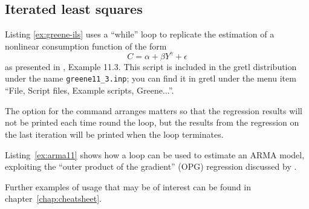 \subsection{Iterated least squares}
\label{loop-ils-examples}

Listing \ref{ex:greene-ils} uses a ``while'' loop to replicate the
estimation of a nonlinear consumption function of the form
\[ C = \alpha + \beta Y^{\gamma} + \epsilon \]
as presented in \cite{greene00}, Example 11.3.  This script is included
in the gretl distribution under the name \verb+greene11_3.inp+;
you can find it in gretl under the menu item ``File, Script files,
Example scripts, Greene...''.

The option  for the  command arranges
matters so that the regression results will not be printed each time
round the loop, but the results from the regression on the last
iteration will be printed when the loop terminates.

\begin{script}[htbp]
\end{script}

Listing~\ref{ex:arma11} shows how a loop can be used to estimate an
ARMA model, exploiting the ``outer product of the gradient'' (OPG)
regression discussed by \cite{davidson-mackinnon93}.

Further examples of  usage that may be of interest can be
found in chapter~\ref{chap:cheatsheet}.

